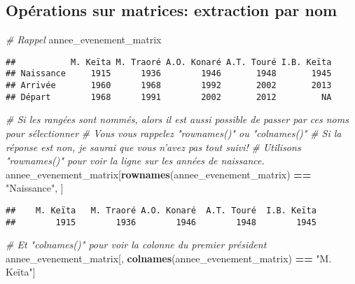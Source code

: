 \documentclass[]{book}
\newenvironment{Shaded}{\begin{snugshade}}{\end{snugshade}}
\newcommand{\KeywordTok}[1]{\textcolor[rgb]{0.13,0.29,0.53}{\textbf{#1}}}
\newcommand{\StringTok}[1]{\textcolor[rgb]{0.31,0.60,0.02}{#1}}
\newcommand{\CommentTok}[1]{\textcolor[rgb]{0.56,0.35,0.01}{\textit{#1}}}
\newcommand{\OperatorTok}[1]{\textcolor[rgb]{0.81,0.36,0.00}{\textbf{#1}}}
\newcommand{\NormalTok}[1]{#1}
\begin{document}
\normalsize

\subsection{Opérations sur matrices: extraction par
nom}\label{operations-sur-matrices-extraction-par-nom}

\tiny

\begin{Shaded}
\begin{Highlighting}[]
\CommentTok{# Rappel}
\NormalTok{annee_evenement_matrix}
\end{Highlighting}
\end{Shaded}

\begin{verbatim}
##           M. Keïta M. Traoré A.O. Konaré A.T. Touré I.B. Keïta
## Naissance     1915      1936        1946       1948       1945
## Arrivée       1960      1968        1992       2002       2013
## Départ        1968      1991        2002       2012         NA
\end{verbatim}

\begin{Shaded}
\begin{Highlighting}[]
\CommentTok{# Si les rangées sont nommés, alors il est aussi possible de passer par ces noms pour sélectionner}
\CommentTok{# Vous vous rappelez "rownames()" ou "colnames()"}
\CommentTok{# Si la réponse est non, je saurai que vous n'avez pas tout suivi!}
\CommentTok{# Utilisons "rownames()" pour voir la ligne sur les années de naissance.}
\NormalTok{annee_evenement_matrix[}\KeywordTok{rownames}\NormalTok{(annee_evenement_matrix) }\OperatorTok{==}\StringTok{ "Naissance"}\NormalTok{, ]}
\end{Highlighting}
\end{Shaded}

\begin{verbatim}
##    M. Keïta   M. Traoré A.O. Konaré  A.T. Touré  I.B. Keïta 
##        1915        1936        1946        1948        1945
\end{verbatim}

\begin{Shaded}
\begin{Highlighting}[]
\CommentTok{# Et "colnames()" pour voir la colonne du premier président}
\NormalTok{annee_evenement_matrix[, }\KeywordTok{colnames}\NormalTok{(annee_evenement_matrix) }\OperatorTok{==}\StringTok{ "M. Keïta"}\NormalTok{]}
\end{Highlighting}
\end{Shaded}
\end{document}
